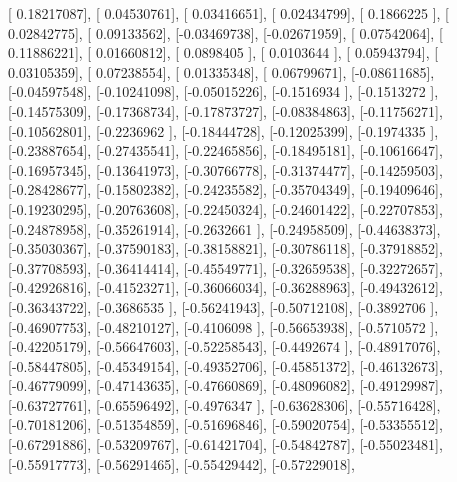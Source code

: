 \documentclass{article}
\begin{document}
       [ 0.18217087],
       [ 0.04530761],
       [ 0.03416651],
       [ 0.02434799],
       [ 0.1866225 ],
       [ 0.02842775],
       [ 0.09133562],
       [-0.03469738],
       [-0.02671959],
       [ 0.07542064],
       [ 0.11886221],
       [ 0.01660812],
       [ 0.0898405 ],
       [ 0.0103644 ],
       [ 0.05943794],
       [ 0.03105359],
       [ 0.07238554],
       [ 0.01335348],
       [ 0.06799671],
       [-0.08611685],
       [-0.04597548],
       [-0.10241098],
       [-0.05015226],
       [-0.1516934 ],
       [-0.1513272 ],
       [-0.14575309],
       [-0.17368734],
       [-0.17873727],
       [-0.08384863],
       [-0.11756271],
       [-0.10562801],
       [-0.2236962 ],
       [-0.18444728],
       [-0.12025399],
       [-0.1974335 ],
       [-0.23887654],
       [-0.27435541],
       [-0.22465856],
       [-0.18495181],
       [-0.10616647],
       [-0.16957345],
       [-0.13641973],
       [-0.30766778],
       [-0.31374477],
       [-0.14259503],
       [-0.28428677],
       [-0.15802382],
       [-0.24235582],
       [-0.35704349],
       [-0.19409646],
       [-0.19230295],
       [-0.20763608],
       [-0.22450324],
       [-0.24601422],
       [-0.22707853],
       [-0.24878958],
       [-0.35261914],
       [-0.2632661 ],
       [-0.24958509],
       [-0.44638373],
       [-0.35030367],
       [-0.37590183],
       [-0.38158821],
       [-0.30786118],
       [-0.37918852],
       [-0.37708593],
       [-0.36414414],
       [-0.45549771],
       [-0.32659538],
       [-0.32272657],
       [-0.42926816],
       [-0.41523271],
       [-0.36066034],
       [-0.36288963],
       [-0.49432612],
       [-0.36343722],
       [-0.3686535 ],
       [-0.56241943],
       [-0.50712108],
       [-0.3892706 ],
       [-0.46907753],
       [-0.48210127],
       [-0.4106098 ],
       [-0.56653938],
       [-0.5710572 ],
       [-0.42205179],
       [-0.56647603],
       [-0.52258543],
       [-0.4492674 ],
       [-0.48917076],
       [-0.58447805],
       [-0.45349154],
       [-0.49352706],
       [-0.45851372],
       [-0.46132673],
       [-0.46779099],
       [-0.47143635],
       [-0.47660869],
       [-0.48096082],
       [-0.49129987],
       [-0.63727761],
       [-0.65596492],
       [-0.4976347 ],
       [-0.63628306],
       [-0.55716428],
       [-0.70181206],
       [-0.51354859],
       [-0.51696846],
       [-0.59020754],
       [-0.53355512],
       [-0.67291886],
       [-0.53209767],
       [-0.61421704],
       [-0.54842787],
       [-0.55023481],
       [-0.55917773],
       [-0.56291465],
       [-0.55429442],
       [-0.57229018],
\end{document}
